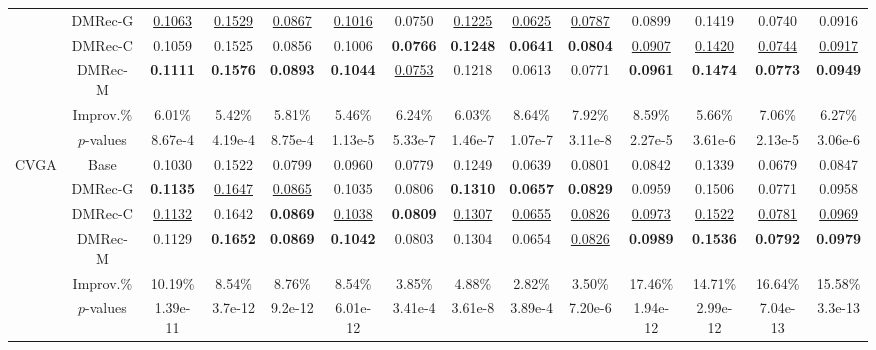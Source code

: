 \documentclass[sigconf]{acmart}
\begin{document}
\begin{table}
\begin{tabular}{c|c|cccc|cccc|cccc}
    \cline{2-14}
    ~ &\textsf{DMRec-G} & \underline{0.1063} & \underline{0.1529} & \underline{0.0867} & \underline{0.1016} & 0.0750 & \underline{0.1225} & \underline{0.0625} & \underline{0.0787} &0.0899 & 0.1419 & 0.0740 & 0.0916\\
    ~ & \textsf{DMRec-C} & 0.1059 & 0.1525 & 0.0856 & 0.1006 & \textbf{0.0766} & \textbf{0.1248} & \textbf{0.0641} & \textbf{0.0804} & \underline{0.0907} & \underline{0.1420} & \underline{0.0744} & \underline{0.0917}\\
    ~ &\textsf{DMRec-M}& \textbf{0.1111} & \textbf{0.1576} & \textbf{0.0893} & \textbf{0.1044} & \underline{0.0753} & 0.1218 & 0.0613 & 0.0771 & \textbf{0.0961} &\textbf{0.1474} &\textbf{0.0773} &\textbf{0.0949}\\
    \cline{2-14}
     ~ & Improv.\% & 6.01\% & 5.42\% & 5.81\% & 5.46\% & 6.24\% & 6.03\% & 8.64\% & 7.92\% & 8.59\% & 5.66\% & 7.06\% & 6.27\%\\
     ~ & $p$-values & 8.67e-4 & 4.19e-4 & 8.75e-4 & 1.13e-5 & 5.33e-7 & 1.46e-7 & 1.07e-7 & 3.11e-8 & 2.27e-5 & 3.61e-6 & 2.13e-5 & 3.06e-6\\
         \hline
    \multirow{6}{*}{CVGA} &Base \cite{zhang2023revisiting} & 0.1030 & 0.1522 & 0.0799 & 0.0960 & 0.0779 & 0.1249 & 0.0639 & 0.0801 &0.0842 &0.1339 & 0.0679 & 0.0847\\
    \cline{2-14}
    ~ &\textsf{DMRec-G} & \textbf{0.1135} & \underline{0.1647} & \underline{0.0865} & 0.1035 & 0.0806 & \textbf{0.1310} & \textbf{0.0657} & \textbf{0.0829} & 0.0959 & 0.1506 & 0.0771 & 0.0958\\
    ~ &\textsf{DMRec-C} & \underline{0.1132} & 0.1642 & \textbf{0.0869} & \underline{0.1038} & \textbf{0.0809} & \underline{0.1307} &\underline{0.0655} &\underline{0.0826} &\underline{0.0973} & \underline{0.1522} & \underline{0.0781} & \underline{0.0969}\\
    ~ &\textsf{DMRec-M} & 0.1129 & \textbf{0.1652} & \textbf{0.0869} & \textbf{0.1042} & 0.0803 & 0.1304 & 0.0654 & \underline{0.0826} & \textbf{0.0989} & \textbf{0.1536} & \textbf{0.0792} & \textbf{0.0979}\\
    \cline{2-14}
     ~ & Improv.\% & 10.19\% & 8.54\% & 8.76\% & 8.54\% & 3.85\% & 4.88\% & 2.82\% & 3.50\% & 17.46\% & 14.71\% & 16.64\% & 15.58\%\\
     ~ & $p$-values & 1.39e-11 & 3.7e-12 & 9.2e-12 & 6.01e-12 & 3.41e-4 & 3.61e-8 & 3.89e-4 & 7.20e-6 & 1.94e-12 & 2.99e-12 & 7.04e-13 & 3.3e-13\\

\hline
  \end{tabular}
\end{table}
\end{document}
